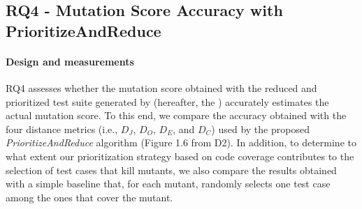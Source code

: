 %

%
%
%


\subsection{RQ4 - Mutation Score Accuracy with PrioritizeAndReduce}
\label{exp:accuracy:prioritize}

\paragraph{Design and measurements}

RQ4 assesses whether the mutation score obtained with the reduced and prioritized test suite generated by \APPR (hereafter, the \MPTS) accurately estimates the actual mutation  score.
To this end, we compare the accuracy obtained with the four distance metrics (i.e., $D_J$, $D_O$, $D_E$, and $D_C$) used by the proposed \emph{PrioritizeAndReduce} algorithm (Figure 1.6 from D2). In addition, to determine to what extent our prioritization strategy based on code coverage contributes to the selection of test cases that kill mutants, we also compare the results obtained with a simple baseline that, for each mutant, randomly selects one test case among the ones that cover the mutant. 



